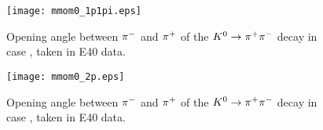 \begin{figure}[!h]
  \begin{center}
    \texttt{[image: mmom0\_1p1pi.eps]}
    \caption{Opening angle between $\pi^{-}$ and $\pi^{+}$ of the $K^0 \to \pi^+ \pi^-$ decay in case , taken in E40 data.}
    \label{fig-mmom0_1p1pi}
  \end{center}
\end{figure}

\begin{figure}[!h]
  \begin{center}
    \texttt{[image: mmom0\_2p.eps]}
    \caption{Opening angle between $\pi^{-}$ and $\pi^{+}$ of the $K^0 \to \pi^+ \pi^-$ decay in case , taken in E40 data.}
    \label{fig-mmom0_2p}
  \end{center}
\end{figure}

\begin{comment}

\begin{figure}[!h]
  \begin{minipage}[t]{0.48\columnwidth}
    \centering
    \texttt{[image: mmom\_sim1.png]}
    \caption{Simulation of the distance of closest approach between the $\pM$ beam and reconstructed $\Kz$ tracks in case \rom{1}.}
    \label{fig-mmom_sim1}
  \end{minipage}
  \hspace{0.04\columnwidth} %
  \begin{minipage}[t]{0.48\columnwidth}
    \centering
    \texttt{[image: mmom\_sim2.png]}
    \caption{Simulation of the distance of closest approach between the $\pM$ beam and reconstructed $\Kz$ tracks in case \rom{2}.}
    \label{fig-mmom_sim2}
  \end{minipage}
\end{figure}

\begin{figure}[!h]
  \begin{minipage}[t]{0.48\columnwidth}
    \centering
    \texttt{[image: mmom\_1.png]}
    \caption{Missing momentum of the $\PiKL$ reaction in case \rom{1}, taken in the E40 data.}
    \label{fig-mmom_1}
  \end{minipage}
  \hspace{0.04\columnwidth} %
  \begin{minipage}[t]{0.48\columnwidth}
    \centering
    \texttt{[image: mmom\_2.png]}
    \caption{Missing momentum of the $\PiKL$ reaction in case \rom{2}, taken in the E40 data.}
    \label{fig-mmom_2}
  \end{minipage}
\end{figure}

\end{comment}
%

